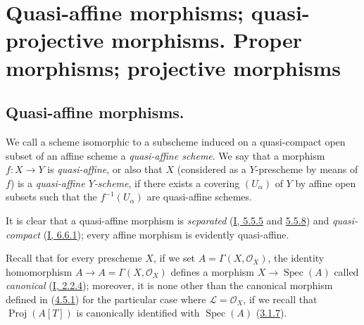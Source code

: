 \section{Quasi-affine morphisms; quasi-projective morphisms. Proper
morphisms; projective morphisms}
\label{section:II.5}

\subsection{Quasi-affine morphisms.}
\label{subsection:II.5.1}

\begin{definition}[5.1.1]
\label{II.5.1.1}
We call a scheme isomorphic to a subscheme induced on a quasi-compact open
subset of an affine scheme a \emph{quasi-affine scheme}. We say that a
morphism $f:X\to Y$ is \emph{quasi-affine}, or also that $X$ (considered as a
$Y$-prescheme by means of $f$) is a \emph{quasi-affine $Y$-scheme}, if there
exists a covering $(U_\alpha)$ of $Y$ by affine open subsets such that the
$f^{-1}(U_\alpha)$ are quasi-affine schemes.
\end{definition}

It is clear that a quasi-affine morphism is \emph{separated}
(\hyperref[I.5.5.5]{I, 5.5.5} and \hyperref[I.5.5.8]{5.5.8}) and
\emph{quasi-compact} (\hyperref[I.6.6.1]{I, 6.6.1}); every affine
morphism is evidently quasi-affine.

Recall that for every prescheme $X$, if we set
$A=\Gamma(X,\mathcal{O}_X)$, the identity homomorphism
$A\to A=\Gamma(X,\mathcal{O}_X)$ defines a morphism
$X\to\operatorname{Spec}(A)$ called \emph{canonical}
(\hyperref[I.2.2.4]{I, 2.2.4}); moreover, it is none other than the
canonical morphism defined in (\hyperref[II.4.5.1]{4.5.1}) for the particular
case where $\mathcal{L}=\mathcal{O}_X$, if we recall that
$\operatorname{Proj}(A[T])$ is canonically identified with
$\operatorname{Spec}(A)$ (\hyperref[II.3.1.7]{3.1.7}).

